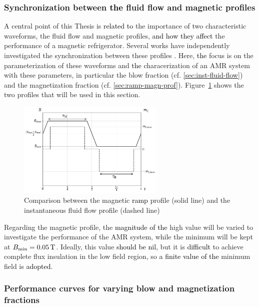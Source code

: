 \documentclass[referee]{svjour3}
\newcommand{\bmin}{\ensuremath{{B}\ped{min}}}
\begin{document}
\subsubsection{Synchronization between \textcolor{black}{the} fluid flow and magnetic profiles}
\label{sec:synchr-betw-fluid}

A central point of this Thesis is \textcolor{black}{related to} the importance of two characteristic waveforms, the fluid flow and magnetic profiles, \textcolor{black}{and how they affect} the performance of a magnetic refrigerator. Several works have independently investigated the synchronization between these profiles \cite{bib:bjoerk11_amr,bib:nakashima17-exper}. Here, \textcolor{black}{the} focus is  on the parameterization of these waveforms and \textcolor{black}{the} characerization of an AMR system with these parameters, in particular the blow fraction (cf. \autoref{sec:inst-fluid-flow}) and the magnetization fraction (cf. \autoref{sec:ramp-magn-prof}). Figure~\ref{fig:ramp-inst} shows the two profiles that will be used in this section.

\begin{figure}[!ht]
  \centering
  \includegraphics[width=7cm]{profiles_rm_and_flow_instantaneous}
  \caption{Comparison between the magnetic \textcolor{black}{ramp} profile (solid line) and the instantaneous fluid flow profile (dashed line)}
  \label{fig:ramp-inst}
\end{figure}
 

Regarding the magnetic profile, the \textcolor{black}{magnitude of the} high value will be varied to investigate the performance of the AMR system, while the minimum will be kept at $\bmin = \SI{0.05}{\tesla}$. Ideally, this value \textcolor{black}{should be nil}, but it is \textcolor{black}{difficult} to achieve complete flux insulation in the low field region, so \textcolor{black}{a finite value of the} minimum field is \textcolor{black}{adopted}.

\subsubsection{Performance curves for varying blow and magnetization fractions}
\label{sec:perf-curv-vary}
\end{document}

